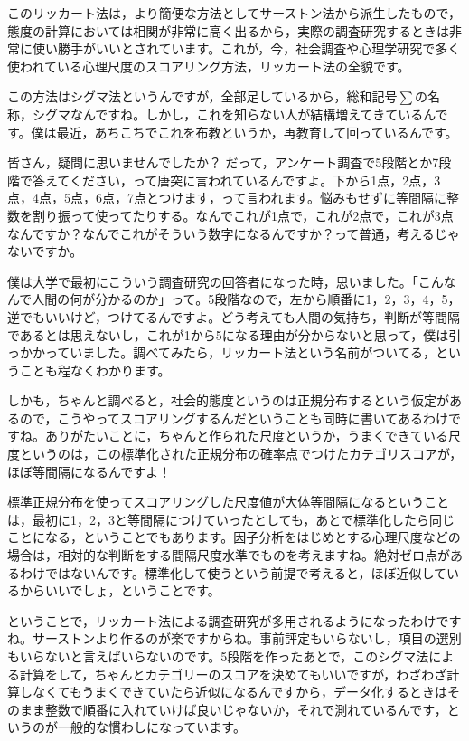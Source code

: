 \documentclass{ltjsbook}
\begin{document}
このリッカート法は，より簡便な方法としてサーストン法から派生したもので，態度の計算においては相関が非常に高く出るから，実際の調査研究するときは非常に使い勝手がいいとされています。これが，今，社会調査や心理学研究で多く使われている心理尺度のスコアリング方法，リッカート法の全貌です。

この方法はシグマ法というんですが，全部足しているから，総和記号$\sum$の名称，シグマなんですね。しかし，これを知らない人が結構増えてきているんです。僕は最近，あちこちでこれを布教というか，再教育して回っているんです。

皆さん，疑問に思いませんでしたか？
だって，アンケート調査で5段階とか7段階で答えてください，って唐突に言われているんですよ。下から1点，2点，3点，4点，5点，6点，7点とつけます，って言われます。悩みもせずに等間隔に整数を割り振って使ってたりする。なんでこれが1点で，これが2点で，これが3点なんですか？なんでこれがそういう数字になるんですか？って普通，考えるじゃないですか。

僕は大学で最初にこういう調査研究の回答者になった時，思いました。「こんなんで人間の何が分かるのか」って。5段階なので，左から順番に1，2，3，4，5，逆でもいいけど，つけてるんですよ。どう考えても人間の気持ち，判断が等間隔であるとは思えないし，これが1から5になる理由が分からないと思って，僕は引っかかっていました。調べてみたら，リッカート法という名前がついてる，ということも程なくわかります。

しかも，ちゃんと調べると，社会的態度というのは正規分布するという仮定があるので，こうやってスコアリングするんだということも同時に書いてあるわけですね。ありがたいことに，ちゃんと作られた尺度というか，うまくできている尺度というのは，この標準化された正規分布の確率点でつけたカテゴリスコアが，ほぼ等間隔になるんですよ！

標準正規分布を使ってスコアリングした尺度値が大体等間隔になるということは，最初に1，2，3と等間隔につけていったとしても，あとで標準化したら同じことになる，ということでもあります。因子分析をはじめとする心理尺度などの場合は，相対的な判断をする間隔尺度水準でものを考えますね。絶対ゼロ点があるわけではないんです。標準化して使うという前提で考えると，ほぼ近似しているからいいでしょ，ということです。

ということで，リッカート法による調査研究が多用されるようになったわけですね。サーストンより作るのが楽ですからね。事前評定もいらないし，項目の選別もいらないと言えばいらないのです。5段階を作ったあとで，このシグマ法による計算をして，ちゃんとカテゴリーのスコアを決めてもいいですが，わざわざ計算しなくてもうまくできていたら近似になるんですから，データ化するときはそのまま整数で順番に入れていけば良いじゃないか，それで測れているんです，というのが一般的な慣わしになっています。
\end{document}
